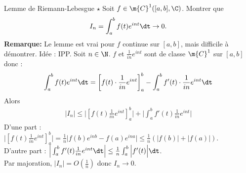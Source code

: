 \documentclass[11pt]{article}
\begin{document}
\begin{ex}{Lemme de Riemann-Lebesgue $\star$}{}
    Soit $f\in\m{C}^1([a,b],\C)$. Montrer que
    \begin{equation*}
        I_n=\int_a^bf(t)e^{int}\dt\to0.
    \end{equation*}
    \textbf{Remarque:} Le lemme est vrai pour $f$ continue sur $[a,b]$, mais difficile à démontrer.
    \tcblower
    Idée : IPP. Soit $n\in\N$. $f$ et $\frac{1}{in}e^{int}$ sont de classe $\m{C}^1$ sur $[a,b]$ donc :
    \begin{equation*}
        \int_a^bf(t)e^{int}\dt=\left[ f(t)\cdot\frac{1}{in}e^{int} \right]_a^b - \int_a^b f'(t)\cdot\frac{1}{in}e^{int}\dt
    \end{equation*}
    Alors
    \begin{align*}
        |I_n|\leq \Big|[f(t)\frac{1}{in}e^{int}]_a^b\Big| + \Big|\int_a^bf'(t)\frac{1}{in}e^{int}\Big|
    \end{align*}
    D'une part : $\Big|\left[ f(t)\frac{1}{in} e^{int}\right]_a^b\Big|=\frac{1}{n}\Big|f(b)e^{inb}-f(a)e^{ina}\Big|\leq\frac{1}{n}(|f(b)|+|f(a)|)$.\\
    D'autre part : $\Big|\int_a^bf'(t)\frac{1}{in}e^{int}\dt\Big|\leq\frac{1}{n}\int_a^b\Big|f'(t)\Big|\dt$.\\
    Par majoration, $|I_n|=O(\frac{1}{n})$ donc $I_n\to0$.
\end{ex}
\end{document}
